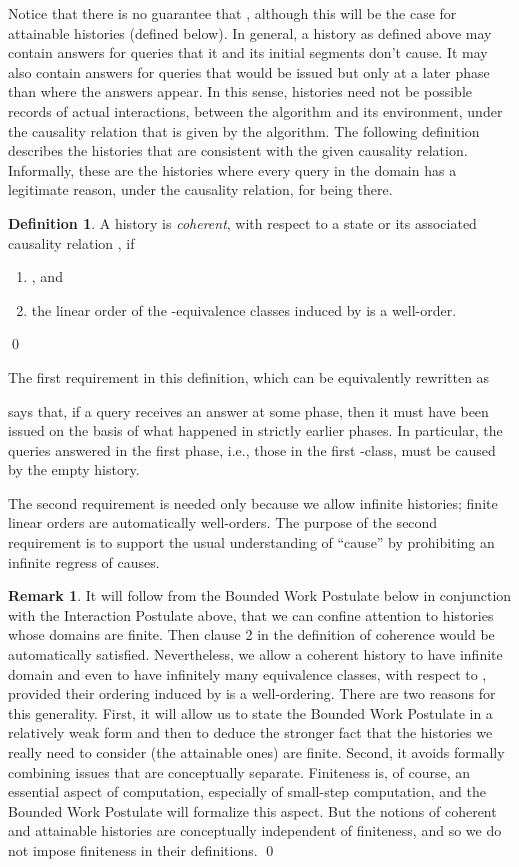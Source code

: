 \documentclass{LMCS}
\theoremstyle{definition}
\newtheorem{df}[thm]{Definition}
\newtheorem{rmk}[thm]{Remark}
\newenvironment{lsnum}{\begin{enumerate}}{\end{enumerate}}
\begin{document}
Notice that there is no guarantee that
, although this will be the case
for attainable histories (defined below).  In general, a history as
defined above may contain answers for queries that it and its initial
segments don't cause.  It may also contain answers for queries that
would be issued but only at a later phase than where the answers
appear.  In this sense, histories need not be possible records of
actual interactions, between the algorithm and its environment, under
the causality relation that is given by the algorithm.  The following
definition describes the histories that are consistent with the given
causality relation.  Informally, these are the histories where every
query in the domain has a legitimate reason, under the causality
relation, for being there.

\begin{df}
  A history  is \emph{coherent}, with respect to a state
   or its associated causality relation , if
  \begin{lsnum}
    \item ,
    and
    \item the linear order of the -equivalence classes
    induced by  is a well-order.
  \end{lsnum}
\qed\end{df}
The first requirement in this definition, which can be equivalently
rewritten as

says that, if a query  receives an answer at some phase, then it
must have been issued on the basis of what happened in strictly earlier
phases.  In particular, the queries answered in the first phase, i.e.,
those in the first -class, must be caused by the empty
history.

The second requirement is needed only because we allow infinite
histories; finite linear orders are automatically well-orders.  The
purpose of the second requirement is to support the usual
understanding of ``cause'' by prohibiting an infinite regress of
causes.

\begin{rmk}
It will follow from the Bounded Work Postulate below in conjunction
with the Interaction Postulate above, that we can confine attention
to histories whose domains are finite.  Then clause 2 in the
definition of coherence would be automatically satisfied.
Nevertheless, we allow a coherent history  to have infinite
domain and even to have infinitely many equivalence classes, with
respect to , provided their ordering induced by 
is a well-ordering. There are two reasons for this generality.
First, it will allow us to state the Bounded Work Postulate in a
relatively weak form and then to deduce the stronger fact that the
histories we really need to consider (the attainable ones) are
finite.  Second, it avoids formally combining issues that are
conceptually separate. Finiteness is, of course, an essential aspect
of computation, especially of small-step computation, and the
Bounded Work Postulate will formalize this aspect.  But the notions
of coherent and attainable histories are conceptually independent of
finiteness, and so we do not impose finiteness in their definitions.
\qed\end{rmk}
\end{document}
